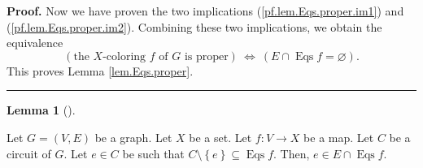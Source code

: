 \documentclass[numbers=enddot,12pt,final,onecolumn,notitlepage]{scrartcl}%
\theoremstyle{definition}
\newtheorem{lem}[theo]{Lemma}
\newenvironment{lemma}[1][]
{\begin{lem}[#1]\begin{leftbar}}
{\end{leftbar}\end{lem}}
\newenvironment{proof}[1][Proof]{\noindent\textbf{#1.} }{\ \rule{0.5em}{0.5em}}
\newenvironment{verlong}{}{}
\begin{document}
\begin{verlong}
\begin{proof}
Now we have proven the two implications (\ref{pf.lem.Eqs.proper.im1}) and
(\ref{pf.lem.Eqs.proper.im2}). Combining these two implications, we obtain the
equivalence%
\[
\left(  \text{the }X\text{-coloring }f\text{ of }G\text{ is proper}\right)
\ \Longleftrightarrow\ \left(  E\cap\operatorname*{Eqs}f=\varnothing\right)
.
\]
This proves Lemma \ref{lem.Eqs.proper}.
\end{proof}
\end{verlong}

\begin{lemma}
\label{lem.Eqs.circuit}Let $G=\left(  V,E\right)  $ be a graph. Let $X$ be a
set. Let $f:V\rightarrow X$ be a map. Let $C$ be a circuit of $G$. Let $e\in
C$ be such that $C\setminus\left\{  e\right\}  \subseteq\operatorname*{Eqs}f$.
Then, $e\in E\cap\operatorname*{Eqs}f$.
\end{lemma}
\end{document}
